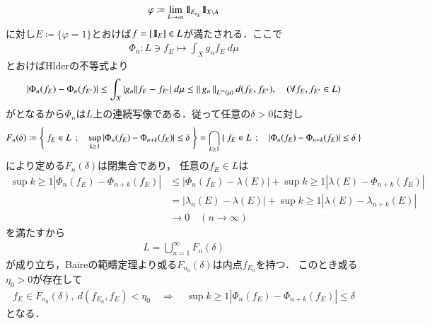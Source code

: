 \begin{prf}
\begin{description}
\begin{align}
					\varphi \coloneqq \lim_{k \to \infty} \mbox{1}\hspace{-0.25em}\mbox{l}_{E_{n_k}} \mbox{1}\hspace{-0.25em}\mbox{l}_{X \backslash A}
				\end{align}
				に対し$E \coloneqq \{\varphi = 1\}$とおけば$f = [\mbox{1}\hspace{-0.25em}\mbox{l}_E] \in L$が満たされる．ここで
				\begin{align}
					\Phi_n: L \ni f_E \longmapsto \int_X g_n f_E\ d\mu
				\end{align}
				とおけばHlderの不等式より
				\begin{align}
					\left| \Phi_n(f_E) - \Phi_n(f_{E'}) \right|
					\leq \int_X |g_n| |f_E - f_{E'}|\ d\mu
					\leq \left\|\, g_n\, \right\|_{L^\infty(\mu)} d(f_E,f_{E'}),
					\quad (\forall f_E,f_{E'} \in L)
				\end{align}
				がとなるから$\Phi_n$は$L$上の連続写像である．従って任意の$\delta > 0$に対し
				\begin{align}
					F_n(\delta) 
					\coloneqq \left\{\ f_E \in L\ \, ; \quad \operatorname*{sup}_{k \geq 1} \left| \Phi_n(f_E)-\Phi_{n+k}(f_E) \right| \leq \delta\ \right\}
					= \bigcap_{k \geq 1} \left\{\ f_E \in L\ \, ; \quad \left| \Phi_n(f_E)-\Phi_{n+k}(f_E) \right| \leq \delta\ \right\}
				\end{align}
				により定める$F_n(\delta)$は閉集合であり，
				任意の$f_E \in L$は
				\begin{align}
					\sup{k \geq 1}{\left| \Phi_n(f_E)-\Phi_{n+k}(f_E) \right|}
					&\leq \left| \Phi_n(f_E)-\lambda(E) \right|
						+ \sup{k \geq 1}{\left| \lambda(E)-\Phi_{n+k}(f_E) \right|} \\
					&= \left| \lambda_n(E)-\lambda(E) \right|
						+ \sup{k \geq 1}{\left| \lambda(E)-\lambda_{n+k}(E) \right|} \\
					&\longrightarrow 0 \quad (n \longrightarrow \infty)
				\end{align}
				を満たすから
				\begin{align}
					L = \bigcup_{n=1}^\infty F_n(\delta)
				\end{align}
				が成り立ち，Baireの範疇定理より或る$F_{n_0}(\delta)$は内点$f_{E_0}$を持つ．
				このとき或る$\eta_0 > 0$が存在して
				\begin{align}
					f_E \in F_{n_0}(\delta),\ d(f_{E_0},f_E) < \eta_0
					\quad \Rightarrow \quad
					\sup{k \geq 1}{\left| \Phi_n(f_E)-\Phi_{n+k}(f_E) \right|} \leq \delta
				\end{align}
				となる．
				

\end{description}
\end{prf}
